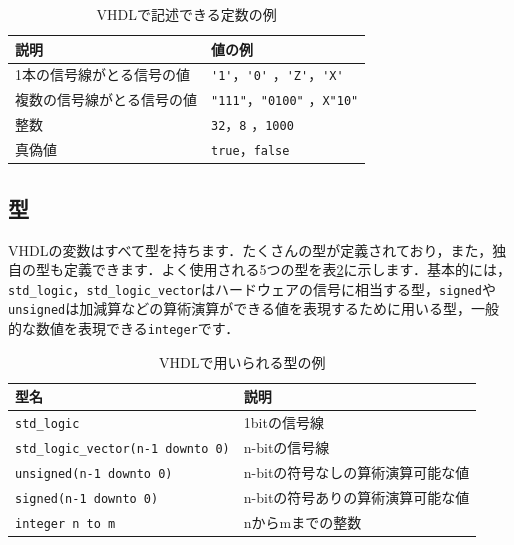 \documentclass[a4paper,dvipdfmx]{jsarticle}
\begin{document}
\begin{table}[H]
\begin{center}
 \begin{tabular}{l|l}
 \hline
  説明                       & 値の例 \\\hline\hline
  1本の信号線がとる信号の値  & \verb|'1'|，\verb|'0'| ，\verb|'Z'|，\verb|'X'|  \\\hline
  複数の信号線がとる信号の値 & \verb|"111"|，\verb|"0100"| ，\verb|X"10"| \\\hline
  整数                       & \verb|32|，\verb|8| ，\verb|1000| \\\hline
  真偽値                     & \verb|true|，\verb|false|\\\hline
 \end{tabular}
\end{center}
\caption{VHDLで記述できる定数の例\label{tbl:vhdl_constants}}
\end{table}


\subsection{型}
VHDLの変数はすべて型を持ちます．たくさんの型が定義されており，また，独自の型も定義できます．よく使用される5つの型を表\ref{tbl:vhdl_types}に示します．基本的には，\verb|std_logic|，\verb|std_logic_vector|はハードウェアの信号に相当する型，\verb|signed|や\verb|unsigned|は加減算などの算術演算ができる値を表現するために用いる型，一般的な数値を表現できる\verb|integer|です．

\begin{table}[H]
\begin{center}
 \begin{tabular}{l|l}
 \hline
  型名                                  & 説明 \\\hline\hline
  \verb|std_logic|                      & 1bitの信号線     \\\hline
  \verb|std_logic_vector(n-1 downto 0)| & n-bitの信号線    \\\hline
  \verb|unsigned(n-1 downto 0)|         & n-bitの符号なしの算術演算可能な値 \\\hline
  \verb|signed(n-1 downto 0)|           & n-bitの符号ありの算術演算可能な値 \\\hline
  \verb|integer n to m|                 & nからmまでの整数 \\\hline
 \end{tabular}
\end{center}
\caption{VHDLで用いられる型の例\label{tbl:vhdl_types}}
\end{table}
\end{document}
